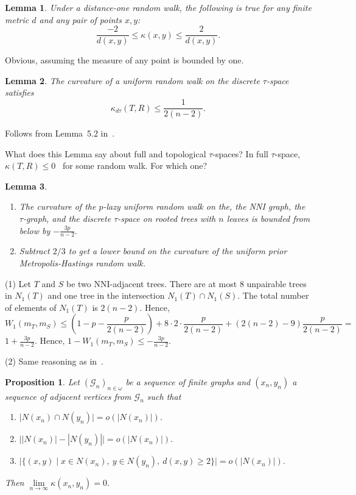 \documentclass{amsart}
\newtheorem{lemma}{Lemma}
\newtheorem{proposition}{Proposition}
\begin{document}
\begin{lemma}
Under a distance-one random walk, the following is true for any finite 
metric $d$ and any pair of points $x,y$:
\[
\dfrac{-2}{d(x,y)} \leq \kappa(x,y) \leq \dfrac{2}{d(x,y)}.
\]
\end{lemma}

\proof
Obvious, assuming the measure of any point is bounded by one. 
\endproof


\begin{lemma}
The curvature of a uniform random walk on the discrete $\tau$-space satisfies 
\[
\kappa_{d\tau}(T,R) \leq 
\dfrac{1}{2(n-2)}.
\]
\end{lemma}

\proof
Follows from Lemma~5.2 in~\cite{WhiddenMatsen}. 
\endproof

What does this Lemma say about full and topological $\tau$-spaces? 
In full $\tau$-space, $\kappa(T,R) \leq 0$~\cite{GD} for some random walk. 
For which one? 

\begin{lemma}
\begin{enumerate}
\item The curvature of the $p$-lazy uniform random walk on the, the NNI
graph, the $\tau$-graph, and the discrete $\tau$-space on rooted trees with 
$n$ leaves is bounded from below by $-\displaystyle\frac{3p}{n-2}.$
\item Subtract $2/3$ to get a lower bound on the curvature of the
uniform prior Metropolis-Hastings random walk.
\end{enumerate}
\end{lemma}

\proof
(1) Let $T$ and $S$ be two NNI-adjacent trees. There are at most $8$ unpairable 
trees in $N_1(T)$ and one tree in the intersection $N_1(T) \cap N_1(S)$. The
total number of elements of $N_1(T)$ is $2(n-2).$
Hence, 
\[
W_1(m_T,m_S)\leq (1 - p - \frac{p}{2(n - 2)}) + 
8 \cdot 2 \cdot \frac{p}{2(n - 2)} +
(2(n - 2) - 9)\frac{p}{2(n-2)} =
\]
$1 + \displaystyle\frac{3p}{n-2}.$ 
Hence, $1 - W_1(m_T,m_S) \leq - \displaystyle\frac{3p}{n-2}.$

(2) Same reasoning as in~\cite{WhiddenMatsen}. 
\endproof

\begin{proposition}
Let $(\mathcal G_n)_{n \in \omega}$ be a sequence of finite graphs and 
$(x_n, y_n)$ a sequence of adjacent vertices from $\mathcal G_n$ such that
\begin{enumerate}[(1)]
\item $\big|N(x_n) \cap N(y_n)\big| = o(|N(x_n)|).$ 
\item $\big||N(x_n)| - |N(y_n)|\big| = o(|N(x_n)|).$ 
\item $\big|\{(x,y) \mid x \in N(x_n),~ y \in N(y_n),~ d(x, y) \geq 2\}\big| 
= o(|N(x_n)|).$
\end{enumerate}

Then $\lim\limits_{n \to \infty} \kappa(x_n, y_n) = 0.$
\end{proposition}
\end{document}
